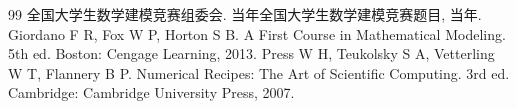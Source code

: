 \begingroup
\footnotesize
\setlength{\itemsep}{0.15ex}
\setlength{\parskip}{0pt}
\begin{thebibliography}{99}
 全国大学生数学建模竞赛组委会. 当年全国大学生数学建模竞赛题目, 当年.
 Giordano F R, Fox W P, Horton S B. A First Course in Mathematical Modeling. 5th ed. Boston: Cengage Learning, 2013.
 Press W H, Teukolsky S A, Vetterling W T, Flannery B P. Numerical Recipes: The Art of Scientific Computing. 3rd ed. Cambridge: Cambridge University Press, 2007.
\end{thebibliography}
\endgroup
